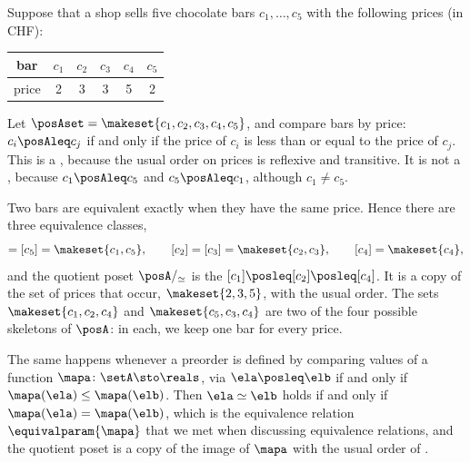\begin{example}
    \label{ex:skeleton-price}
    Suppose that a shop sells five chocolate bars $c_1, \dots, c_5$ with the following prices (in CHF):
    \begin{center}
        \begin{tabular}{c|ccccc}
            bar & $c_1$ & $c_2$ & $c_3$ & $c_4$ & $c_5$ \\
            \hline
            price & 2 & 3 & 3 & 5 & 2
        \end{tabular}
    \end{center}
    Let $\posAset = \makeset{c_1, c_2, c_3, c_4, c_5}$, and compare bars by price: $c_i \posAleq c_j$ if and only if the price of $c_i$ is less than or equal to the price of $c_j$.
    This is a , because the usual order on prices is reflexive and transitive.
    It is not a , because $c_1 \posAleq c_5$ and $c_5 \posAleq c_1$, although $c_1 \neq c_5$.

    Two bars are equivalent exactly when they have the same price.
    Hence there are three equivalence classes,
    \begin{equation}
        [c_1] = [c_5] = \makeset{c_1, c_5},
        \qquad
        [c_2] = [c_3] = \makeset{c_2, c_3},
        \qquad
        [c_4] = \makeset{c_4},
    \end{equation}
    and the quotient poset $\posA/_{\simeq}$ is the  $[c_1] \posleq [c_2] \posleq [c_4]$.
    It is a copy of the set of prices that occur, $\makeset{2, 3, 5}$, with the usual order.
    The sets $\makeset{c_1, c_2, c_4}$ and $\makeset{c_5, c_3, c_4}$ are two of the four possible skeletons of $\posA$: in each, we keep one bar for every price.

    The same happens whenever a preorder is defined by comparing values of a function $\mapa \colon \setA \sto \reals$, via $\ela \posleq \elb$ if and only if $\mapa(\ela) \leq \mapa(\elb)$.
    Then $\ela \simeq \elb$ holds if and only if $\mapa(\ela) = \mapa(\elb)$, which is the equivalence relation $\equivalparam{\mapa}$ that we met when discussing equivalence relations, and the quotient poset is a copy of the image of $\mapa$ with the usual order of \reals.
\end{example}

\begin{marginfigure}
    \centering
    \\
    \caption{Passing from the reachability preorder of a directed graph to a poset.}
    \label{fig:skeleton-reachability}
\end{marginfigure}

